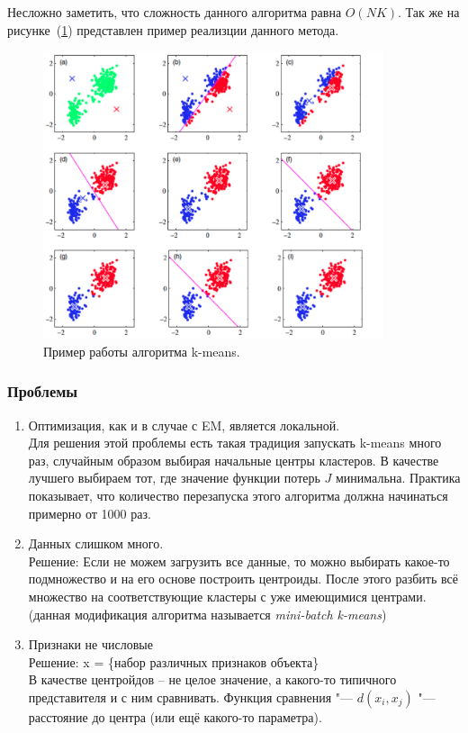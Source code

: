 Несложно заметить, что сложность данного алгоритма равна $O(NK)$. Так же на рисунке~(\ref{k-means}) представлен пример реализции данного метода.

\begin{figure}[H]
\centering
    \includegraphics[width=100mm]{images/KM.png}
    \caption{Пример работы алгоритма k-means.}
    \label{k-means}
\end{figure}


\subsubsection{Проблемы}
\begin{enumerate}
\item Оптимизация, как и в случае с EM, является локальной.\\
Для решения этой проблемы есть такая традиция запускать k-means много раз, случайным образом выбирая начальные центры кластеров. В качестве лучшего выбираем тот, где значение функции потерь $J$ минимальна. Практика показывает, что количество перезапуска этого алгоритма должна начинаться примерно от 1000 раз.
\item Данных слишком много.\\
Решение: Если не можем загрузить все данные, то можно выбирать какое-то подмножество и на его основе построить центроиды. После этого разбить всё множество на соответствующие кластеры с уже имеющимися центрами. (данная модификация алгоритма называется {\it mini-batch k-means})
\item Признаки не числовые\\
Решение: x = \{набор различных признаков объекта\}\\ 
В качестве центройдов -- не целое значение, а какого-то типичного представителя и с ним сравнивать. Функция сравнения "--- $d(x_i,x_j)$ "--- расстояние до центра (или ещё какого-то параметра).\\
\end{enumerate}

